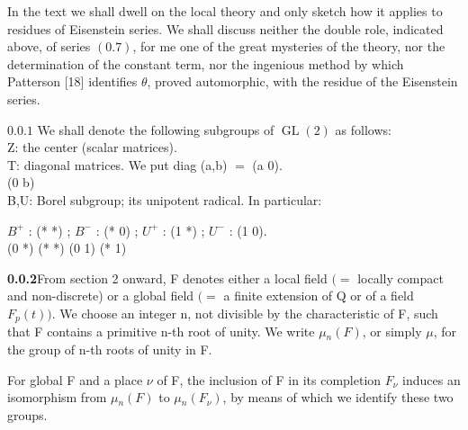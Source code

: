 \documentclass[10pt,a4paper]{article}
\begin{document}
\par In the text we shall dwell on the local theory and only sketch how it applies to residues of Eisenstein series. We shall discuss neither the double role, indicated above, of series $(0.7)$, for me one of the great mysteries of the theory, nor the determination of the constant term, nor the ingenious method by which Patterson [18] identifies $\theta{}$, proved automorphic, with the residue of the Eisenstein series.\par

\clearpage
{}
\label{d035-physical-008}
\par\medskip{}\par\smallskip
\par\smallskip\begin{center}\begin{minipage}{0.96\textwidth}\centering
$0.0.1$ We shall denote the following subgroups of $\operatorname{GL}(2)$ as follows: \\ Z: the center (scalar matrices). \\ T: diagonal matrices. We put diag (a,b) $=$ (a 0). \\ (0 b) \\ B,U: Borel subgroup; its unipotent radical. In particular:
\end{minipage}\end{center}\smallskip
\par\smallskip\begin{center}\begin{minipage}{0.96\textwidth}\centering
$B^+$ : (* *) ; $B^-$ : (* 0) ; $U^+$ : (1 *) ; $U^-$ : (1 0). \\ (0 *) (* *) (0 1) (* 1)
\end{minipage}\end{center}\smallskip
\par\noindent\textbf{0.0.2}\quad From section 2 onward, F denotes either a local field $(=$ locally compact and non-discrete) or a global field $(=$ a finite extension of Q or of a field $F_p(t))$. We choose an integer n, not divisible by the characteristic of F, such that F contains a primitive n-th root of unity. We write $\mu{}_n(F)$, or simply $\mu{}$, for the group of n-th roots of unity in F.\par
\par For global F and a place $\nu{}$ of F, the inclusion of F in its completion $F_\nu{}$ induces an isomorphism from $\mu{}_n(F)$ to $\mu{}_n(F_\nu{})$, by means of which we identify these two groups.\par
\end{document}

